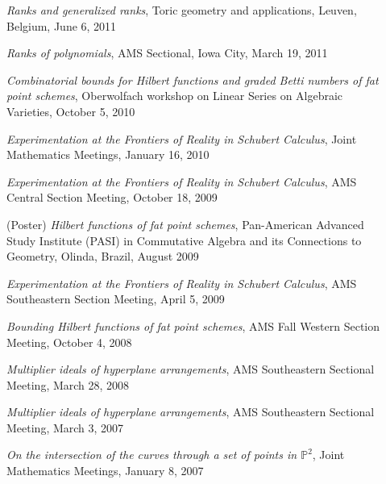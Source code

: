 \documentclass[12pt]{article}
\begin{document}
\begin{description}
\item[] \textit{Ranks and generalized ranks},
Toric geometry and applications, Leuven, Belgium, June 6, 2011

\item[] \textit{Ranks of polynomials}, AMS Sectional, Iowa City, March 19, 2011

\item[] \textit{Combinatorial bounds for Hilbert functions and graded Betti numbers of fat point schemes},
Oberwolfach workshop on Linear Series on Algebraic Varieties, October 5, 2010

\item[] \textit{Experimentation at the Frontiers of Reality in Schubert Calculus},
Joint Mathematics Meetings, January 16, 2010

\item[] \textit{Experimentation at the Frontiers of Reality in Schubert Calculus},
AMS Central Section Meeting, October 18, 2009

\item[] (Poster) \textit{Hilbert functions of fat point schemes},
Pan-American Advanced Study Institute (PASI) 
in 
Commutative Algebra and its Connections to Geometry,
Olinda, Brazil, August 2009

\item[] \textit{Experimentation at the Frontiers of Reality in Schubert Calculus},
AMS Southeastern Section Meeting, April 5, 2009

\item[] \textit{Bounding Hilbert functions of fat point schemes},
AMS Fall Western Section Meeting, October 4, 2008

\item[] \textit{Multiplier ideals of hyperplane arrangements},
AMS Southeastern Sectional Meeting, March 28, 2008

\item[] \textit{Multiplier ideals of hyperplane arrangements},
AMS Southeastern Sectional Meeting, March 3, 2007

\item[] \textit{On the intersection of the curves through a set of points in $\mathbb{P}^2$},
Joint Mathematics Meetings, January 8, 2007




\end{description}
\end{document}
